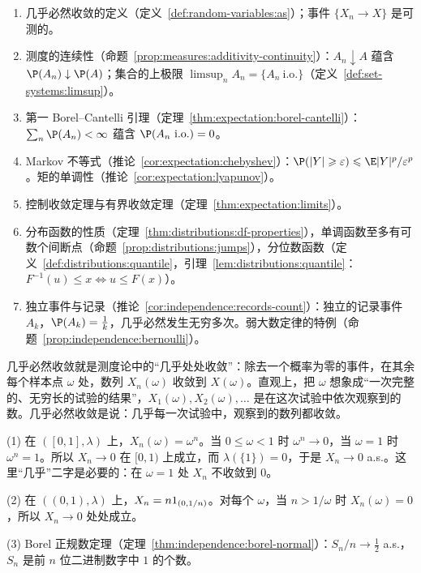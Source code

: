 \begin{enumerate}
\item 几乎必然收敛的定义（定义~\ref{def:random-variables:as}）；事件 $\{X_n\to X\}$ 是可测的。
\item 测度的连续性（命题~\ref{prop:measures:additivity-continuity}）：$A_n\downarrow A$ 蕴含 $\P(A_n)\downarrow \P(A)$；集合的上极限 $\limsup_nA_n=\{A_n\ \text{i.o.}\}$（定义~\ref{def:set-systems:limsup}）。
\item 第一 Borel--Cantelli 引理（定理~\ref{thm:expectation:borel-cantelli}）：$\sum_n\P(A_n)<\infty$ 蕴含 $\P(A_n\ \text{i.o.})=0$。
\item Markov 不等式（推论~\ref{cor:expectation:chebyshev}）：$\P(\abs Y\geqslant\varepsilon)\leqslant \E\abs Y^p/\varepsilon^p$。矩的单调性（推论~\ref{cor:expectation:lyapunov}）。
\item 控制收敛定理与有界收敛定理（定理~\ref{thm:expectation:limits}）。
\item 分布函数的性质（定理~\ref{thm:distributions:df-properties}），单调函数至多有可数个间断点（命题~\ref{prop:distributions:jumps}），分位数函数（定义~\ref{def:distributions:quantile}，引理~\ref{lem:distributions:quantile}：$F^{-1}(u)\leqslant x\iff u\leqslant F(x)$）。
\item 独立事件与记录（推论~\ref{cor:independence:records-count}）：独立的记录事件 $A_k$，$\P(A_k)=\frac1k$，几乎必然发生无穷多次。弱大数定律的特例（命题~\ref{prop:independence:bernoulli}）。
\end{enumerate}


几乎必然收敛就是测度论中的“几乎处处收敛”：除去一个概率为零的事件，在其余每个样本点 $\omega$ 处，数列 $X_n(\omega)$ 收敛到 $X(\omega)$。直观上，把 $\omega$ 想象成“一次完整的、无穷长的试验的结果”，$X_1(\omega),X_2(\omega),\dots$ 是在这次试验中依次观察到的数。几乎必然收敛是说：几乎每一次试验中，观察到的数列都收敛。

\begin{example}[几乎必然收敛的例子]\label{ex:convergence:as-examples}
(1) 在 $([0,1],\lambda)$ 上，$X_n(\omega)=\omega^n$。当 $0\leqslant\omega<1$ 时 $\omega^n\to0$，当 $\omega=1$ 时 $\omega^n=1$。所以 $X_n\to0$ 在 $[0,1)$ 上成立，而 $\lambda(\{1\})=0$，于是 $X_n\to0$ a.s.。这里“几乎”二字是必要的：在 $\omega=1$ 处 $X_n$ 不收敛到 $0$。

(2) 在 $((0,1),\lambda)$ 上，$X_n=n1_{(0,1/n)}$。对每个 $\omega$，当 $n>1/\omega$ 时 $X_n(\omega)=0$，所以 $X_n\to0$ 处处成立。

(3) Borel 正规数定理（定理~\ref{thm:independence:borel-normal}）：$S_n/n\to\frac12$ a.s.，$S_n$ 是前 $n$ 位二进制数字中 $1$ 的个数。
\end{example}


